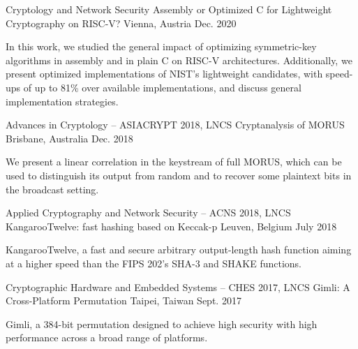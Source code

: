 \begin{cventries}
	\cventry
	{Cryptology and Network Security}
	{Assembly or Optimized C for Lightweight Cryptography on RISC-V?} %
	{Vienna, Austria} %
	{Dec. 2020} %
	{
		\begin{cvitems} %
			\item {In this work, we studied the general impact of optimizing symmetric-key algorithms in assembly and in plain C on RISC-V architectures. Additionally, we present optimized implementations of NIST's lightweight candidates, with speed-ups of up to 81\% over available implementations, and discuss general implementation strategies.\\}
		\end{cvitems}
	}

	\cventry
	{Advances in Cryptology – ASIACRYPT 2018, LNCS}
	{Cryptanalysis of MORUS} %
	{Brisbane, Australia} %
	{Dec. 2018} %
	{
		\begin{cvitems} %
			\item {We present a linear correlation in the keystream of full MORUS, which can be used to distinguish its output from random and to recover some plaintext bits in the broadcast setting.\\}
		\end{cvitems}
	}

	\cventry
	{Applied Cryptography and Network Security – ACNS 2018, LNCS}
	{KangarooTwelve: fast hashing based on Keccak-p} %
	{Leuven, Belgium} %
	{July 2018} %
	{
		\begin{cvitems} %
			\item {KangarooTwelve, a fast and secure arbitrary output-length hash function aiming at a higher speed than the FIPS 202’s SHA-3 and SHAKE functions.\\}
		\end{cvitems}
	}

	\cventry
	{Cryptographic Hardware and Embedded Systems – CHES 2017, LNCS}
	{Gimli: A Cross-Platform Permutation} %
	{Taipei, Taiwan} %
	{Sept. 2017} %
	{
		\begin{cvitems} %
			\item {Gimli, a 384-bit permutation designed to achieve high security with high performance across a broad range of platforms.\\}
		\end{cvitems}
	}


\end{cventries}

